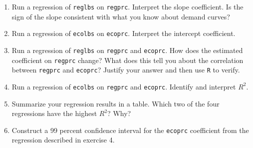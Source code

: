\documentclass[11pt]{article}
\begin{document}
\begin{onehalfspacing}
\begin{enumerate}
\item Run a regression of \texttt{reglbs} on \texttt{regprc}. Interpret the slope coefficient. Is the sign of the slope consistent with what you know about demand curves?
\item Run a regression of \texttt{ecolbs} on \texttt{ecoprc}. Interpret the intercept coefficient.
\item Run a regression of \texttt{reglbs} on \texttt{regprc} and \texttt{ecoprc}. How does the estimated coefficient on \texttt{regprc} change? What does this tell you about the correlation between \texttt{regprc} and \texttt{ecoprc}? Justify your answer and then use \texttt{R} to verify.
\item Run a regression of \texttt{ecolbs} on \texttt{regprc} and \texttt{ecoprc}. Identify and interpret $R^2$.
\item Summarize your regression results in a table. Which two of the four regressions have the highest $R^2$? Why?
\item Construct a 99 percent confidence interval for the \texttt{ecoprc} coefficient from the regression described in exercise 4.

\end{enumerate}
\end{onehalfspacing}
\end{document}
